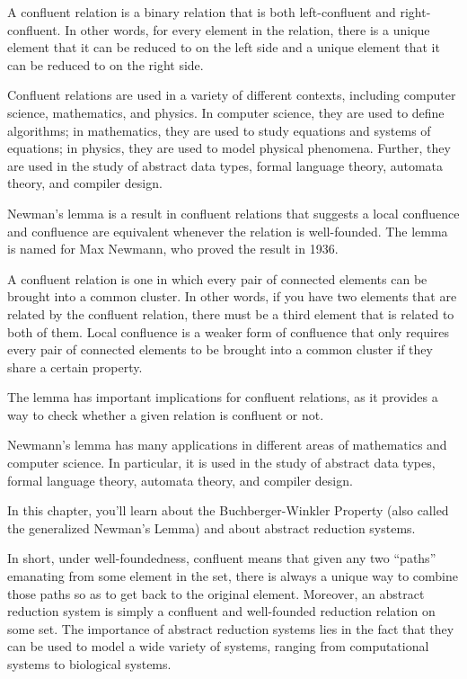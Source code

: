 \documentclass[
  letterpaper,
  10pt,
  reqno,
  twopage,
  openany]{book}
\theoremstyle{plain}
\theoremstyle{definition}
\theoremstyle{definition}
\theoremstyle{definition}
\theoremstyle{plain}
\theoremstyle{plain}
\theoremstyle{remark}
\begin{document}
A conﬂuent relation is a binary relation that is both left-conﬂuent and
right-conﬂuent. In other words, for every element in the relation, there
is a unique element that it can be reduced to on the left side and a
unique element that it can be reduced to on the right side.

Conﬂuent relations are used in a variety of different contexts,
including computer science, mathematics, and physics. In computer
science, they are used to define algorithms; in mathematics, they are
used to study equations and systems of equations; in physics, they are
used to model physical phenomena. Further, they are used in the study of
abstract data types, formal language theory, automata theory, and
compiler design.

Newman's lemma is a result in confluent relations that suggests a local
confluence and confluence are equivalent whenever the relation is
well-founded. The lemma is named for Max Newmann, who proved the result
in 1936.

A confluent relation is one in which every pair of connected elements
can be brought into a common cluster. In other words, if you have two
elements that are related by the confluent relation, there must be a
third element that is related to both of them. Local confluence is a
weaker form of confluence that only requires every pair of connected
elements to be brought into a common cluster if they share a certain
property.

The lemma has important implications for confluent relations, as it
provides a way to check whether a given relation is confluent or not.

Newmann's lemma has many applications in different areas of mathematics
and computer science. In particular, it is used in the study of abstract
data types, formal language theory, automata theory, and compiler
design.

In this chapter, you'll learn about the Buchberger-Winkler Property
(also called the generalized Newman's Lemma) and about abstract
reduction systems.

In short, under well-foundedness, confluent means that given any two
``paths'' emanating from some element in the set, there is always a
unique way to combine those paths so as to get back to the original
element. Moreover, an abstract reduction system is simply a confluent
and well-founded reduction relation on some set. The importance of
abstract reduction systems lies in the fact that they can be used to
model a wide variety of systems, ranging from computational systems to
biological systems.
\end{document}
